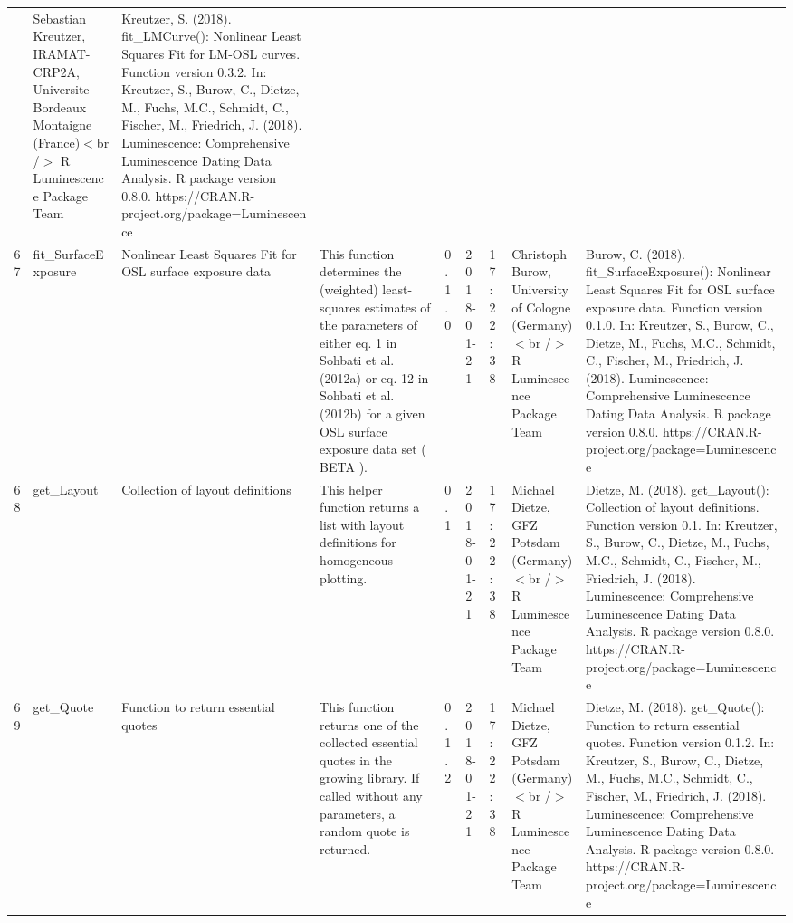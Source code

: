 \begin{table}[ht]
\begin{tabular}{rllllllll}
 & Sebastian Kreutzer, IRAMAT-CRP2A, Universite Bordeaux Montaigne (France)$<$br /$>$  R Luminescence Package Team & Kreutzer, S. (2018). fit\_LMCurve(): Nonlinear Least Squares Fit for LM-OSL curves. Function version 0.3.2. In: Kreutzer, S., Burow, C., Dietze, M., Fuchs, M.C., Schmidt, C., Fischer, M., Friedrich, J. (2018). Luminescence: Comprehensive Luminescence Dating Data Analysis. R package version 0.8.0. https://CRAN.R-project.org/package=Luminescence
 \\ 
  67 & fit\_SurfaceExposure & Nonlinear Least Squares Fit for OSL surface exposure data & This function determines the (weighted) least-squares estimates of the parameters of either eq. 1 in  Sohbati et al. (2012a)  or eq. 12 in Sohbati et al. (2012b)  for a given OSL surface exposure data set ( BETA ). & 0.1.0 & 2018-01-21 & 17:22:38
 & Christoph Burow, University of Cologne (Germany)$<$br /$>$  R Luminescence Package Team & Burow, C. (2018). fit\_SurfaceExposure(): Nonlinear Least Squares Fit for OSL surface exposure data. Function version 0.1.0. In: Kreutzer, S., Burow, C., Dietze, M., Fuchs, M.C., Schmidt, C., Fischer, M., Friedrich, J. (2018). Luminescence: Comprehensive Luminescence Dating Data Analysis. R package version 0.8.0. https://CRAN.R-project.org/package=Luminescence
 \\ 
  68 & get\_Layout & Collection of layout definitions & This helper function returns a list with layout definitions for homogeneous plotting. & 0.1 & 2018-01-21 & 17:22:38
 & Michael Dietze, GFZ Potsdam (Germany)$<$br /$>$  R Luminescence Package Team & Dietze, M. (2018). get\_Layout(): Collection of layout definitions. Function version 0.1. In: Kreutzer, S., Burow, C., Dietze, M., Fuchs, M.C., Schmidt, C., Fischer, M., Friedrich, J. (2018). Luminescence: Comprehensive Luminescence Dating Data Analysis. R package version 0.8.0. https://CRAN.R-project.org/package=Luminescence
 \\ 
  69 & get\_Quote & Function to return essential quotes & This function returns one of the collected essential quotes in the growing library. If called without any parameters, a random quote is returned. & 0.1.2 & 2018-01-21 & 17:22:38
 & Michael Dietze, GFZ Potsdam (Germany)$<$br /$>$  R Luminescence Package Team & Dietze, M. (2018). get\_Quote(): Function to return essential quotes. Function version 0.1.2. In: Kreutzer, S., Burow, C., Dietze, M., Fuchs, M.C., Schmidt, C., Fischer, M., Friedrich, J. (2018). Luminescence: Comprehensive Luminescence Dating Data Analysis. R package version 0.8.0. https://CRAN.R-project.org/package=Luminescence

\end{tabular}
\end{table}
